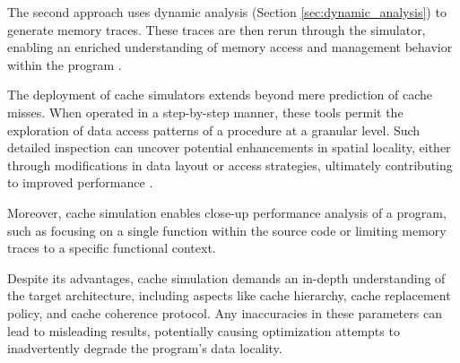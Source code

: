 The second approach uses dynamic analysis (Section \ref{sec:dynamic_analysis}) to generate memory traces. These traces are then rerun through the simulator, enabling an enriched understanding of memory access and management behavior within the program \cite{choudhury2011abstract}.

The deployment of cache simulators extends beyond mere prediction of cache misses. When operated in a step-by-step manner, these tools permit the exploration of data access patterns of a procedure at a granular level. Such detailed inspection can uncover potential enhancements in spatial locality, either through modifications in data layout or access strategies, ultimately contributing to improved performance \cite{schaad2022boosting,hammer2017kerncraft,choudhury2011abstract}.

Moreover, cache simulation enables close-up performance analysis of a program, such as focusing on a single function within the source code or limiting memory traces to a specific functional context.

Despite its advantages, cache simulation demands an in-depth understanding of the target architecture, including aspects like cache hierarchy, cache replacement policy, and cache coherence protocol. Any inaccuracies in these parameters can lead to misleading results, potentially causing optimization attempts to inadvertently degrade the program's data locality.

